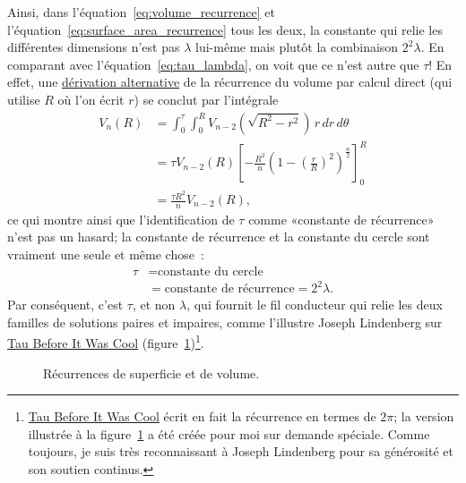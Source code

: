 Ainsi, dans l'équation~\eqref{eq:volume_recurrence} et
l'équation~\eqref{eq:surface_area_recurrence} tous les deux, la constante qui
relie les différentes dimensions n'est pas $\lambda$ lui-même mais plutôt la
combinaison $2^2\lambda$. En comparant avec l'équation~\eqref{eq:tau_lambda}, on
voit que ce n'est autre que $\tau$\ns! En effet, une
\href{https://en.wikipedia.org/wiki/Volume_of_an_n-ball#The_two-dimension_recursion_formula}{dérivation
alternative} de la récurrence du volume par calcul direct (qui utilise $R$ où
l'on écrit $r$) se conclut par l'intégrale
\begin{equation}
\label{eq:integral_recurrence}
\begin{split}
V_n(R) & = \int_0^\tau \int_0^R V_{n-2}\left(\sqrt{R^2 - r^2}\right) \,r\,dr\,d\theta \\
       & = \tau V_{n-2}(R) \left[-\frac{R^2}{n}\left(1 - \left(\frac{r}{R}\right)^2\right)^\frac{n}{2}\right]_{0}^{R} \\
       & = \frac{\tau R^2}{n} V_{n-2}(R),
\end{split}
\end{equation}
ce qui montre ainsi que l'identification de $\tau$ comme «\ns constante de
récurrence\ns » n'est pas un hasard\ns; la constante de récurrence et la constante
du cercle sont vraiment une seule et même chose~:
\[
\begin{split}
\tau & = \mbox{constante du cercle} \\
     & = \mbox{constante de récurrence} = 2^2\lambda.
\end{split}
\]
Par conséquent, c'est $\tau$, et non $\lambda$, qui fournit le fil conducteur
qui relie les deux familles de solutions paires et impaires, comme l'illustre
Joseph Lindenberg sur
\href{https://sites.google.com/site/taubeforeitwascool/}{Tau Before It Was Cool}
(figure~\ref{fig:Nspheres})\ns\footnote{\href{https://sites.google.com/site/taubeforeitwascool/}{Tau
Before It Was Cool} écrit en fait la récurrence en termes de $2\pi$\ns; la
version illustrée à la figure~\ref{fig:Nspheres} a été créée pour moi sur
demande spéciale. Comme toujours, je suis très reconnaissant à Joseph Lindenberg
pour sa générosité et son soutien continus.}.

\begin{figure}
\begin{center}
\end{center}
\caption{Récurrences de superficie et de volume.\label{fig:Nspheres}}
\end{figure}

